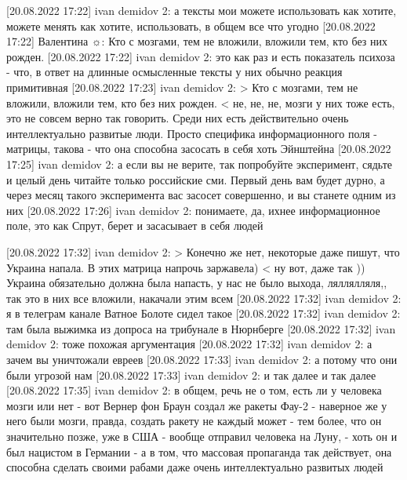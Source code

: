 [20.08.2022 17:22] ivan demidov 2: а тексты мои можете использовать как хотите, можете менять как хотите, использовать, в общем все что угодно
[20.08.2022 17:22] Валентина ☼: Кто с мозгами, тем не вложили, вложили тем, кто без них рожден.
[20.08.2022 17:22] ivan demidov 2: это как раз и есть показатель психоза - что, в ответ на длинные осмысленные тексты у них обычно реакция примитивная
[20.08.2022 17:23] ivan demidov 2: 
> Кто с мозгами, тем не вложили, вложили тем, кто без них рожден. <
не, не, не, мозги у них тоже есть, это не совсем верно так говорить. Среди них есть действительно очень интеллектуально развитые люди. Просто специфика информационного поля - матрицы, такова - что она способна засосать в себя хоть Эйнштейна
[20.08.2022 17:25] ivan demidov 2: а если вы не верите, так попробуйте эксперимент, сядьте и целый день читайте только российские сми. Первый день вам будет дурно, а через месяц такого эксперимента вас засосет совершенно, и вы станете одним из них
[20.08.2022 17:26] ivan demidov 2: понимаете, да, ихнее информационное поле, это как Спрут, берет и засасывает в себя людей

[20.08.2022 17:32] ivan demidov 2: 
> Конечно же нет, некоторые даже пишут, что Украина напала. В этих матрица напрочь заржавела) <
ну вот, даже так )) Украина обязательно должна была напасть, у нас не было выхода, ляллялляля,, так это в них все вложили, накачали этим всем
[20.08.2022 17:32] ivan demidov 2: я в телеграм канале Ватное Болоте сидел такое
[20.08.2022 17:32] ivan demidov 2: там была выжимка из допроса на трибунале в Нюрнберге
[20.08.2022 17:32] ivan demidov 2: тоже похожая аргументация
[20.08.2022 17:32] ivan demidov 2: а зачем вы уничтожали евреев
[20.08.2022 17:33] ivan demidov 2: а потому что они были угрозой нам
[20.08.2022 17:33] ivan demidov 2: и так далее и так далее
[20.08.2022 17:35] ivan demidov 2: в общем, речь не о том, есть ли у человека мозги или нет - вот Вернер фон Браун создал же ракеты Фау-2 - наверное же у него были мозги, правда, создать ракету не каждый может - тем более, что он значительно позже, уже в США - вообще отправил человека на Луну, - хоть он и был нацистом в Германии - а в том, что массовая пропаганда так действует, она способна сделать своими рабами даже очень интеллектуально развитых людей

